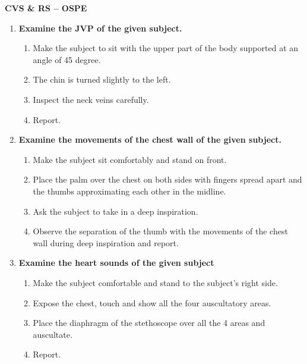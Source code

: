 \documentclass[a4paper,10pt]{article}
\begin{document}
\vspace*{\fill}

\newpage
	\begin{center}
		\begin{Huge}
				\textbf {CVS \& RS -- OSPE}
		\end{Huge}	
	\end{center}
\begin{enumerate}[I]
\item \textbf{Examine the JVP of the given subject.}
	\begin{enumerate}[1]
		\item Make the subject to sit with the upper part of the body supported at an angle of 45 degree.
		\item The chin is turned slightly to the left.
		\item Inspect the neck veins carefully.
		\item Report.
	\end{enumerate}
	
\item \textbf{Examine the movements of the chest wall of the given subject.}
	\begin{enumerate}[1]
	\item Make the subject sit comfortably and stand on front.
	\item Place the palm over the chest on both sides with fingers spread apart and the thumbs approximating each other in the midline.
	\item Ask the subject to take in a deep inspiration.
	\item Observe the separation of the thumb with the movements of the chest wall during deep inspiration and report.
	\end{enumerate}

\item \textbf{Examine the heart sounds of the given subject}
	\begin{enumerate}
	\item Make the subject comfortable and stand to the subject’s right side.
	\item Expose the chest, touch and show all the four auscultatory areas.
	\item Place the diaphragm of the stethoscope over all the 4 areas and auscultate.
	\item Report. 
	\end{enumerate}

\end{enumerate}
\end{document}
